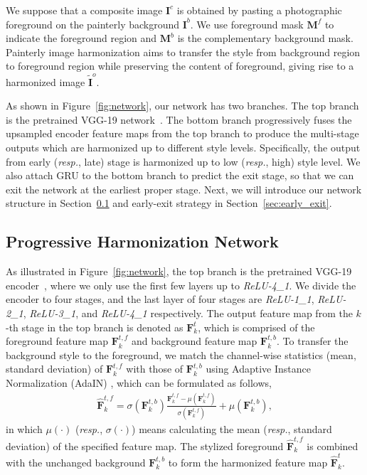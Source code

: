 \documentclass[letterpaper]{article} %
\begin{document}
We suppose that a composite image $\bm{I}^c$ is obtained by pasting a photographic foreground on the painterly background $\bm{I}^b$. We use foreground mask $\bm{M}^f$ to indicate the foreground region and $\bm{M}^b$ is the complementary background mask. Painterly image harmonization aims to transfer the style from background region to foreground region while preserving the content of foreground, giving rise to a harmonized image $\tilde{\bm{I}}^o$.

As shown in Figure~\ref{fig:network}, our network has two branches. The top branch is the pretrained VGG-19 network~\cite{VGG19}. The bottom branch progressively fuses the upsampled encoder feature maps from the top branch to produce the multi-stage outputs which are harmonized up to different style levels. Specifically, the output from early (\emph{resp.}, late) stage is harmonized up to low (\emph{resp.}, high) style level.
We also attach GRU to the bottom branch to predict the exit stage, so that we can exit the network at the earliest proper stage. Next, we will introduce our network structure in Section~\ref{sec:main_network} and early-exit strategy in Section~\ref{sec:early_exit}.

\subsection {Progressive Harmonization Network} \label{sec:main_network}

As illustrated in Figure~\ref{fig:network}, the top branch is the pretrained VGG-19 encoder~\cite{VGG19}, where we only use the first few layers up to \emph{ReLU-4\_1}. We divide the encoder to four stages, and the last layer of four stages are \emph{ReLU-1\_1}, \emph{ReLU-2\_1}, \emph{ReLU-3\_1}, and \emph{ReLU-4\_1} respectively. The output feature map from the $k$-th stage in the top branch is denoted as $\bm{F}^{t}_k$, which is comprised of the foreground feature map  $\bm{F}^{t,f}_k$ and background feature map  $\bm{F}^{t,b}_k$. To transfer the background style to the foreground, we match the channel-wise statistics (mean, standard deviation) of $\bm{F}^{t,f}_k$ with those of $\bm{F}^{t,b}_k$ using Adaptive Instance Normalization (AdaIN) \cite{huang2017arbitrary}, which can be formulated as follows,
\begin{eqnarray}\label{eqn:adain}
    \hat{\bm{F}}^{t,f}_{k} = \sigma(\bm{F}^{t,b}_k)\frac{\bm{F}^{t,f}_k-\mu(\bm{F}^{t,f}_k)}{\sigma(\bm{F}^{t,f}_k)} + \mu(\bm{F}^{t,b}_k),
\end{eqnarray}
in which $\mu(\cdot)$ (\emph{resp.}, $\sigma(\cdot)$) means calculating the mean (\emph{resp.}, standard deviation) of the specified feature map. The stylized foreground $\hat{\bm{F}}^{t,f}_{k}$ is combined with the unchanged background $\bm{F}^{t,b}_k$ to form the harmonized feature map $\hat{\bm{F}}^{t}_{k}$.
\end{document}
